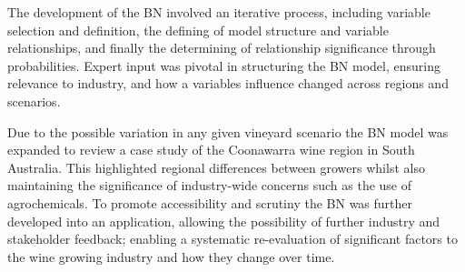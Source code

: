 The development of the BN involved an iterative process, including variable selection and definition, the defining of model structure and variable relationships, and finally the determining of relationship significance through probabilities. Expert input was pivotal in structuring the BN model, ensuring relevance to industry, and how a variables influence changed across regions and scenarios.

Due to the possible variation in any given vineyard scenario the BN model was expanded to review a case study of the Coonawarra wine region in South Australia. This highlighted regional differences between growers whilst also maintaining the significance of industry-wide concerns such as the use of agrochemicals. To promote accessibility and scrutiny the BN was further developed into an application, allowing the possibility of further industry and stakeholder feedback; enabling a systematic re-evaluation of significant factors to the wine growing industry and how they change over time.

